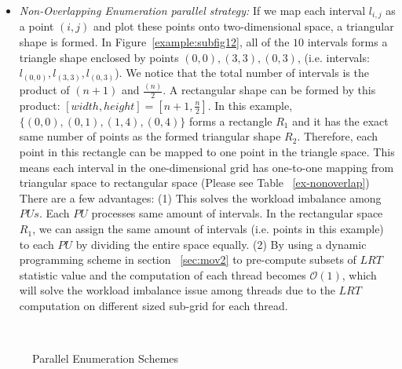 \documentclass[AMA,LATO1COL]{WileyNJD-v2}
\newcommand\bigo{\mathcal O}
\begin{document}
\begin{itemize}
\item \emph{Non-Overlapping Enumeration parallel strategy:}
If we map each interval $l_{i,j}$ as a point $(i,j)$ and plot these points onto two-dimensional space, a triangular shape is formed. In Figure~\ref{example:subfig12}, all of the $10$ intervals forms a triangle shape enclosed by points ${(0,0),(3,3),(0,3)}$, (i.e. intervals: ${l_{(0,0)},l_{(3,3)},l_{(0,3)}}$). We notice that the total number of intervals is the product of $(n+1)$ and ${\frac{(n)}{2}}$. A rectangular shape can be formed by this product: $[width,height]=[n+1,{\frac{n}{2}}]$. In this example, $\{{(0,0)},{(0,1)},{(1,4)},{(0,4)}\}$ forms a rectangle $R_1$ and it has the exact same number of points as the formed triangular shape $R_2$. Therefore, each point in this rectangle can be mapped to one point in the triangle space. This means each interval in the one-dimensional grid has one-to-one mapping from triangular space to rectangular space (Please see Table ~\ref{ex-nonoverlap})\\
There are a few advantages: (1) This solves the workload imbalance among $PUs$. Each $PU$ processes same amount of intervals. In the rectangular space $R_1$, we can assign the same amount of intervals (i.e. points in this example) to each $PU$ by dividing the entire space equally. (2) By using a dynamic programming scheme in section ~\ref{sec:mov2} to pre-compute subsets of $LRT$ statistic value and the computation of each thread becomes $\bigo(1)$, which will solve the workload imbalance issue among threads due to the $LRT$ computation on different sized sub-grid for each thread.

 \end{itemize}



\begin{figure}[t]
\centering
{}
~~\\
\caption{Parallel Enumeration Schemes\label{example1}}
\end{figure}
\end{document}
